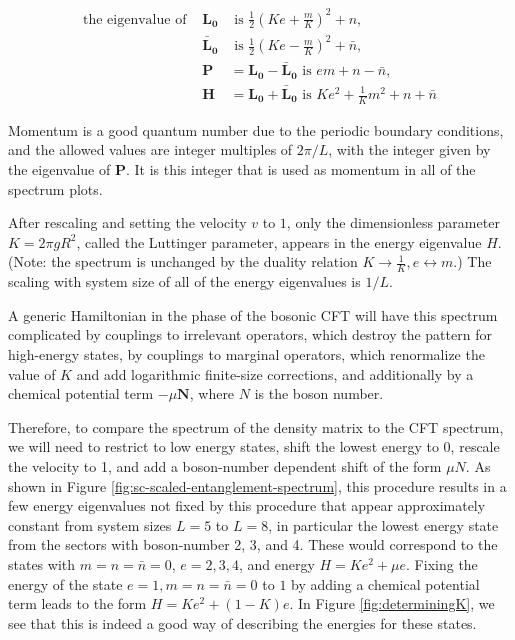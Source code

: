 \documentclass{article}
\begin{document}
\begin{eqnarray*}
\text{the eigenvalue of }
&\mathbf{L_0}& \text{ is } \frac{1}{2}(Ke + \frac{m}{K})^2 + n\text{,}\\
&\mathbf{\bar{L}_0}& \text{ is } \frac{1}{2}(Ke - \frac{m}{K})^2 + \bar{n}\text{,}\\
&\mathbf{P}& = \mathbf{L_0} - \mathbf{\bar{L}_0} \text{ is } em + n - \bar{n}\text{,}\\
&\mathbf{H}& = \mathbf{L_0} + \mathbf{\bar{L}_0} \text{ is } K e^2 + \frac{1}{K}m^2 + n + \bar{n}
\label{eq:spectrum}
\end{eqnarray*}

Momentum is a good quantum number due to the periodic boundary conditions, and the allowed values are integer multiples of $2\pi /L$, with the integer given by the eigenvalue of $\mathbf{P}$. It is this integer that is used as momentum in all of the spectrum plots.

After rescaling and setting the velocity $v$ to $1$, only the dimensionless parameter $K = 2 \pi g R^2$, called the Luttinger parameter, appears in the energy eigenvalue $H$. (Note: the spectrum is unchanged by the duality relation $K \rightarrow \frac{1}{K}, e \leftrightarrow m$.) The scaling with system size of all of the energy eigenvalues is $1/L$. 

A generic Hamiltonian in the phase of the bosonic CFT will have this spectrum complicated by couplings to irrelevant operators, which destroy the pattern for high-energy states, by couplings to marginal operators, which renormalize the value of $K$ and add logarithmic finite-size corrections, and additionally by a chemical potential term $-\mu \mathbf{N}$, where $N$ is the boson number. 

Therefore, to compare the spectrum of the density matrix to the CFT spectrum, we will need to restrict to low energy states, shift the lowest energy to 0, rescale the velocity to 1, and add a boson-number dependent shift of the form $\mu N$. As shown in Figure \ref{fig:sc-scaled-entanglement-spectrum}, this procedure results in a few energy eigenvalues not fixed by this procedure that appear approximately constant from system sizes $L=5$ to $L=8$, in particular the lowest energy state from the sectors with boson-number 2, 3, and 4. These would correspond to the states with $m=n=\bar{n}=0$, $e = 2, 3, 4$, and energy $H = Ke^2 + \mu e$. Fixing the energy of the state $e=1, m=n=\bar{n} = 0$ to $1$ by adding a chemical potential term leads to the form $H = Ke^2 + (1 - K)e$. In Figure \ref{fig:determiningK}, we see that this is indeed a good way of describing the energies for these states.
\end{document}
